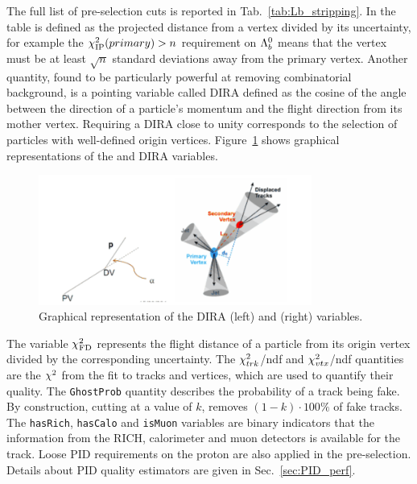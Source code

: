 The full list of pre-selection cuts is reported in Tab.~\ref{tab:Lb_stripping}.
In the table \chisqip is defined as the projected distance from a vertex
divided by its uncertainty, for example the $\chi^2_{\rm IP}(primary) > n$ requirement on ${{\Lambda}^0_{b}}$ means
that the \Lb vertex must be at least $\sqrt{n}$ standard deviations away from the primary vertex.
Another quantity, found to be particularly powerful at removing combinatorial background, is a pointing 
variable called DIRA defined as the cosine of the angle between the direction of a particle's momentum 
and the flight direction from its mother vertex. Requiring a DIRA close to unity corresponds to 
the selection of particles with well-defined origin vertices.
Figure~\ref{fig:IPandDIRA} shows graphical representations of the \chisqip and DIRA variables.
%
\begin{figure}[hb]
\centering
\includegraphics[width=0.8\textwidth]{Lmumu/figs/IPandDIRA.png}
\caption{Graphical representation of the DIRA (left) and \chisqip (right) variables.}
\label{fig:IPandDIRA}
\end{figure}
%
The variable $\chi^2_{\rm FD}$ represents the flight distance of a particle from its origin vertex
divided by the corresponding uncertainty. The $\chi^2_{trk}$/ndf and $\chi^2_{vtx}$/ndf quantities 
are the $\chi^2$ from the fit to tracks and vertices, which are used to quantify their quality.
The \verb!GhostProb! quantity describes the probability of a track being fake.
By construction, cutting at a value of $k$, removes $(1 - k)\cdot 100 \%$ of fake tracks.
The \verb!hasRich!, \verb!hasCalo! and \verb!isMuon! variables are binary indicators that
the information from the RICH, calorimeter and muon detectors is available for the track.
Loose PID requirements on the proton are also applied in the pre-selection.
Details about PID quality estimators are given in Sec.~\ref{sec:PID_perf}.
